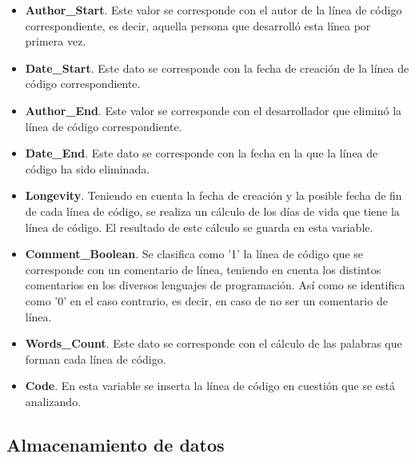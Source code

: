 \documentclass[a4paper, 12pt]{book}
\begin{document}
\begin{itemize}
  \item \textbf{Author\_Start}. Este valor se corresponde con el autor de la línea de código correspondiente, es decir, aquella persona que desarrolló esta línea por primera vez.
  \item \textbf{Date\_Start}. Este dato se corresponde con la fecha de creación de la línea de código correspondiente.
  \item \textbf{Author\_End}. Este valor se corresponde con el desarrollador que eliminó la línea de código correspondiente.
  \item \textbf{Date\_End}.   Este dato se corresponde con la fecha en la que la línea de código ha sido eliminada.
  \item \textbf{Longevity}. Teniendo en cuenta la fecha de creación y la posible fecha de fin de cada línea de código, se realiza un cálculo de los días de vida que tiene la línea de código. El resultado de este cálculo se guarda en esta variable.
  \item \textbf{Comment\_Boolean}. Se clasifica como '1' la línea de código que se corresponde con un comentario de línea, teniendo en cuenta los distintos comentarios en los diversos lenguajes de programación. Así como se identifica como '0' en el
  caso contrario, es decir, en caso de no ser un comentario de línea.
  \item \textbf{Words\_Count}. Este dato se corresponde con el cálculo de las palabras que forman cada línea de código. 
  \item \textbf{Code}. En esta variable se inserta la línea de código en cuestión que se está analizando.
\end{itemize}

\subsection{Almacenamiento de datos}
\label{subsec:almacenamiento}
\end{document}
